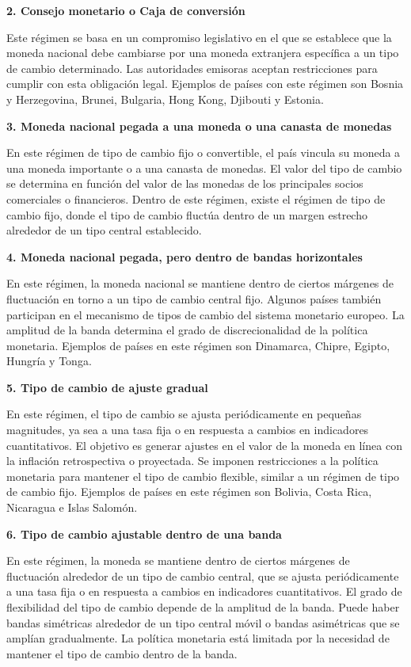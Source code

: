 \documentclass[
  letterpaper,
  DIV=11,
  numbers=noendperiod]{scrartcl}
\begin{document}
\textbf{2. Consejo monetario o Caja de conversión}

Este régimen se basa en un compromiso legislativo en el que se establece
que la moneda nacional debe cambiarse por una moneda extranjera
específica a un tipo de cambio determinado. Las autoridades emisoras
aceptan restricciones para cumplir con esta obligación legal. Ejemplos
de países con este régimen son Bosnia y Herzegovina, Brunei, Bulgaria,
Hong Kong, Djibouti y Estonia.

\textbf{3. Moneda nacional pegada a una moneda o una canasta de monedas}

En este régimen de tipo de cambio fijo o convertible, el país vincula su
moneda a una moneda importante o a una canasta de monedas. El valor del
tipo de cambio se determina en función del valor de las monedas de los
principales socios comerciales o financieros. Dentro de este régimen,
existe el régimen de tipo de cambio fijo, donde el tipo de cambio
fluctúa dentro de un margen estrecho alrededor de un tipo central
establecido.

\textbf{4. Moneda nacional pegada, pero dentro de bandas horizontales}

En este régimen, la moneda nacional se mantiene dentro de ciertos
márgenes de fluctuación en torno a un tipo de cambio central fijo.
Algunos países también participan en el mecanismo de tipos de cambio del
sistema monetario europeo. La amplitud de la banda determina el grado de
discrecionalidad de la política monetaria. Ejemplos de países en este
régimen son Dinamarca, Chipre, Egipto, Hungría y Tonga.

\textbf{5. Tipo de cambio de ajuste gradual}

En este régimen, el tipo de cambio se ajusta periódicamente en pequeñas
magnitudes, ya sea a una tasa fija o en respuesta a cambios en
indicadores cuantitativos. El objetivo es generar ajustes en el valor de
la moneda en línea con la inflación retrospectiva o proyectada. Se
imponen restricciones a la política monetaria para mantener el tipo de
cambio flexible, similar a un régimen de tipo de cambio fijo. Ejemplos
de países en este régimen son Bolivia, Costa Rica, Nicaragua e Islas
Salomón.

\textbf{6. Tipo de cambio ajustable dentro de una banda}

En este régimen, la moneda se mantiene dentro de ciertos márgenes de
fluctuación alrededor de un tipo de cambio central, que se ajusta
periódicamente a una tasa fija o en respuesta a cambios en indicadores
cuantitativos. El grado de flexibilidad del tipo de cambio depende de la
amplitud de la banda. Puede haber bandas simétricas alrededor de un tipo
central móvil o bandas asimétricas que se amplían gradualmente. La
política monetaria está limitada por la necesidad de mantener el tipo de
cambio dentro de la banda.
\end{document}

